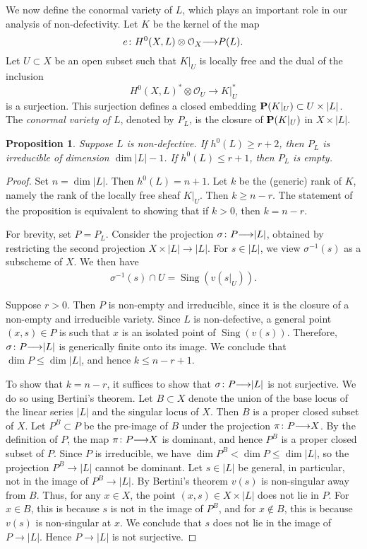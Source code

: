 \documentclass[11pt,reqno]{amsart}
\theoremstyle{plain}
\newtheorem{proposition}[theorem]{Proposition}
\theoremstyle{definition}
\theoremstyle{remark}
\numberwithin{equation}{section}
\DeclareMathOperator{\sing}{Sing}
\renewcommand{\to}{{\longrightarrow}}
\numberwithin{equation}{section}
\renewcommand{\O}{\mathcal O}
\begin{document}
We now define the conormal variety of $L$, which plays an important role in our analysis of non-defectivity.
Let $K$ be the kernel of the map
\[ e \from H^0(X, L) \otimes \O_X \to P(L).\]
Let $U \subset X$ be an open subset such that $K|_U$ is locally free and the dual of the inclusion 
\[H^0(X, L)^* \otimes \O_U \to K|_U^*\]
is a surjection.
This surjection defines a closed embedding $\P(K|_U) \subset U \times |L|$.
The \emph{conormal variety of $L$}, denoted by $P_L$, is the closure of $\P(K|_U)$ in $X \times |L|$.

\begin{proposition}\label{prop:dimension}
  \label{prop:dimP}
  Suppose $L$ is non-defective.
  If $h^0(L) \geq r+2$, then $P_L$ is irreducible of dimension $\dim |L| - 1$.
  If $h^0(L) \leq r+1$, then $P_L$ is empty.
\end{proposition} 

\begin{proof}
  Set $n = \dim |L|$.
  Then $h^0(L) = n+1$.
  Let $k$ be the (generic) rank of $K$, namely the rank of the locally free sheaf $K|_U$.
  Then $k \geq n-r$.
  The statement of the proposition is equivalent to showing that if $k > 0$, then $k = n-r$.

  For brevity, set $P = P_L$.
  Consider the projection $\sigma \from P \to |L|$, obtained by restricting the second projection $X \times |L| \to |L|$.
  For $s \in |L|$, we view $\sigma^{-1}(s)$ as a subscheme of $X$.
  We then have
  \begin{align*}
    \sigma^{-1}(s) \cap U = \sing(v(s|_U)).
  \end{align*}

  Suppose $r>0$.
  Then $P$ is non-empty and irreducible, since it is the closure of a non-empty and irreducible variety.
  Since $L$ is non-defective, a general point $(x,s) \in P$ is such that $x$ is an isolated point of $\sing(v(s))$.
  Therefore, $\sigma \from P \to |L|$ is generically finite onto its image.
  We conclude that $\dim P \leq \dim |L|$, and hence $k \leq n-r+1$.

  To show that $k = n-r$, it suffices to show that $\sigma \from P \to |L|$ is not surjective.
  We do so using Bertini's theorem.
  Let $B \subset X$ denote the union of the base locus of the linear series $|L|$ and the singular locus of $X$.
  Then $B$ is a proper closed subset of $X$.
  Let $P^B \subset P$ be the pre-image of $B$ under the projection $\pi \from P \to X$.
  By the definition of $P$, the map $\pi \from P \to X$ is dominant, and hence $P^B$ is a proper closed subset of $P$.
  Since $P$ is irreducible, we have $\dim P^B < \dim P \leq \dim |L|$, so the projection $P^B \to |L|$ cannot be dominant.
  Let $s \in |L|$ be general, in particular, not in the image of $P^B \to |L|$.
  By Bertini's theorem $v(s)$ is non-singular away from $B$.
  Thus, for any $x \in X$, the point $(x, s) \in X \times |L|$ does not lie in $P$.
  For $x \in B$, this is because $s$ is not in the image of $P^B$, and for $x \not \in B$, this is because $v(s)$ is non-singular at $x$.
  We conclude that $s$ does not lie in the image of $P \to |L|$.
  Hence $P \to |L|$ is not surjective.
\end{proof} 
\end{document}
